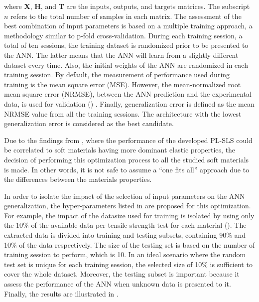 \noindent where \textbf{X}, \textbf{H}, and \textbf{T} are the inputs, outputs, and targets matrices. The subscript $n$ refers to the total number of samples in each matrix. The assessment of the best combination of input parameters is based on a multiple training approach, a methodology similar to p-fold cross-validation. During each training session, a total of ten sessions, the training dataset is randomized prior to be presented to the ANN. The latter means that the ANN will learn from a slightly different dataset every time. Also, the initial weights of the ANN are randomized in each training session. By default, the measurement of performance used during training is the mean square error (MSE). However, the mean-normalized root mean square error (NRMSE), between the ANN prediction and the experimental data, is used for validation () \cite{bergstrom2015mechanics}. Finally, generalization error is defined as the mean NRMSE value from all the training sessions. The architecture with the lowest generalization error is considered as the best candidate.

Due to the findings from , where the performance of the developed PL-SLS could be correlated to soft materials having more dominant elastic properties, the decision of performing this optimization process to all the studied soft materials is made. In other words, it is not safe to assume a ``one fits all'' approach due to the differences between the materials properties.
 
In order to isolate the impact of the selection of input parameters on the ANN generalization, the hyper-parameters listed in  are proposed for this optimization. For example, the impact of the datasize used for training is isolated by using only the 10\% of the available data per tensile strength test for each material (). The extracted data is divided into training and testing subsets, containing 90\% and 10\% of the data respectively. The size of the testing set is based on the number of training session to perform, which is 10. In an ideal scenario where the random test set is unique for each training session, the selected size of 10\% is sufficient to cover the whole dataset. Moreover, the testing subset is important because it assess the performance of the ANN when unknown data is presented to it. Finally, the results are illustrated in .


